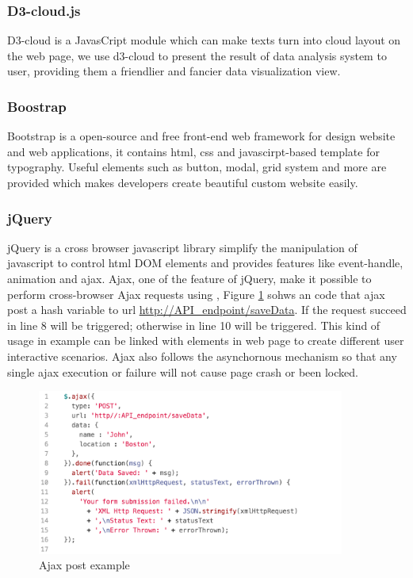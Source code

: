 \subsubsection{D3-cloud.js}
D3-cloud \cite{d3cloud} is a JavasCript module which can make texts turn into cloud layout on the web page, we use d3-cloud to present the result of data analysis system to user, providing them a friendlier and fancier data visualization view.

\subsubsection{Boostrap}
Bootstrap\cite{bootstrap} is a open-source and free front-end web framework for design website and web applications, it contains html, css and javascirpt-based template for typography.
Useful elements such as button, modal, grid system and more are provided which makes developers create beautiful custom website easily.

\subsubsection{jQuery}
jQuery is a \cite{jquery} cross browser javascript library simplify the manipulation of javascript to control html DOM elements and provides features like event-handle, animation and ajax.
Ajax, one of the feature of jQuery, make it possible to perform cross-browser Ajax requests using , Figure \ref{fig:ajaxpost} sohws an code that ajax post a hash variable  to url \url{http://API_endpoint/saveData}.
If the request succeed  in line 8 will be triggered; otherwise  in line 10 will be triggered.
This kind of usage in example can be linked with elements in web page to create different user interactive scenarios.
Ajax also follows the asynchornous mechanism so that any single ajax execution or failure will not cause page crash or been locked.

\begin{figure}[H]
    \centering
    \includegraphics[width = 0.9\textwidth]{fig/ajax-example.png}
    \caption{Ajax post example}
    \label{fig:ajaxpost}
\end{figure}


